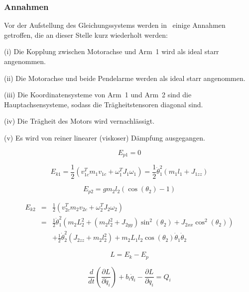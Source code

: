 \subsubsection{Annahmen}
\label{sub.sub.Annahmen}
Vor der Aufstellung des Gleichungssystems werden in~\cite{Cazzolato.2011} einige Annahmen getroffen, die an dieser Stelle kurz wiederholt werden:
\begin{list}{}{}
\item{(i)} Die Kopplung zwischen Motorachse und Arm~1 wird als ideal starr angenommen.
\item{(ii)} Die Motorachse und beide Pendelarme werden als ideal starr angenommen.
\item{(iii)} Die Koordinatensysteme von Arm~1 und Arm~2 sind die Hauptachsensysteme, sodass die Trägheitstensoren diagonal sind.
\item{(iv)} Die Trägheit des Motors wird vernachlässigt. %
\item{(v)} Es wird von reiner linearer (viskoser) Dämpfung ausgegangen.
\end{list}

\begin{equation}
 E_{p1} = 0
\end{equation}

\begin{equation}
E_{k1}=\frac{1}{2}(v^T_{1c}m_1v_{1c}+\omega^T_1J_1\omega_1)=\frac{1}{2}\dot{\theta}^2_1(m_1l_1+J_{1zz})
\end{equation}

\begin{equation}
E_{p2}=gm_2l_2(\cos(\theta_2)-1)
\end{equation}

\begin{eqnarray}
E_{k2}&=&\frac{1}{2}(v^T_{2c}m_2v_{2c}+\omega^T_2J_2\omega_2)\nonumber \\
&=&\frac{1}{2}\dot{\theta}^2_1(m_2L^2_2+(m_2l^2_2+J_{2yy})\sin^2(\theta_2)+J_{2xx}\cos^2(\theta_2))\nonumber \\
&&+\frac{1}{2}\dot{\theta}^2_2(J_{2zz}+m_2l^2_2)+m_2L_1l_2\cos(\theta_2)\dot{\theta}_1\dot{\theta}_2
\end{eqnarray}

\begin{equation}
L=E_k-E_p
\end{equation}

\begin{equation}
\frac{d}{dt}(\frac{\partial L}{\partial\dot{q_i}})+b_i\dot{q}_i-\frac{\partial L}{\partial q_i}=Q_i
\end{equation}

